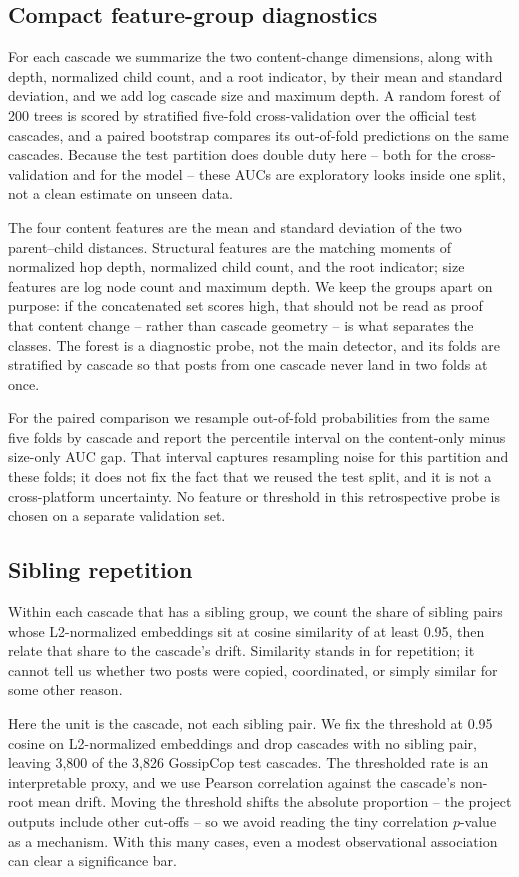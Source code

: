 \documentclass[conference]{IEEEtran}
\begin{document}
\subsection{Compact feature-group diagnostics}
For each cascade we summarize the two content-change dimensions, along with
depth, normalized child count, and a root indicator, by their mean and standard
deviation, and we add log cascade size and maximum depth. A random forest of
200 trees is scored by stratified five-fold cross-validation over the official
test cascades, and a paired bootstrap compares its out-of-fold predictions on
the same cascades. Because the test partition does double duty here -- both for
the cross-validation and for the model -- these AUCs are exploratory looks
inside one split, not a clean estimate on unseen data.

The four content features are the mean and standard deviation of the two
parent--child distances. Structural features are the matching moments of
normalized hop depth, normalized child count, and the root indicator; size
features are log node count and maximum depth. We keep the groups apart on
purpose: if the concatenated set scores high, that should not be read as proof
that content change -- rather than cascade geometry -- is what separates the
classes. The forest is a diagnostic probe, not the main detector, and its
folds are stratified by cascade so that posts from one cascade never land in
two folds at once.

For the paired comparison we resample out-of-fold probabilities from the same
five folds by cascade and report the percentile interval on the content-only
minus size-only AUC gap. That interval captures resampling noise for this
partition and these folds; it does not fix the fact that we reused the test
split, and it is not a cross-platform uncertainty. No feature or threshold in
this retrospective probe is chosen on a separate validation set.

\subsection{Sibling repetition}
Within each cascade that has a sibling group, we count the share of sibling
pairs whose L2-normalized embeddings sit at cosine similarity of at least 0.95,
then relate that share to the cascade's drift. Similarity stands in for
repetition; it cannot tell us whether two posts were copied, coordinated, or
simply similar for some other reason.

Here the unit is the cascade, not each sibling pair. We fix the threshold at
0.95 cosine on L2-normalized embeddings and drop cascades with no sibling pair,
leaving 3,800 of the 3,826 GossipCop test cascades. The thresholded rate is an
interpretable proxy, and we use Pearson correlation against the cascade's
non-root mean drift. Moving the threshold shifts the absolute proportion -- the
project outputs include other cut-offs -- so we avoid reading the tiny
correlation $p$-value as a mechanism. With this many cases, even a modest
observational association can clear a significance bar.
\end{document}
